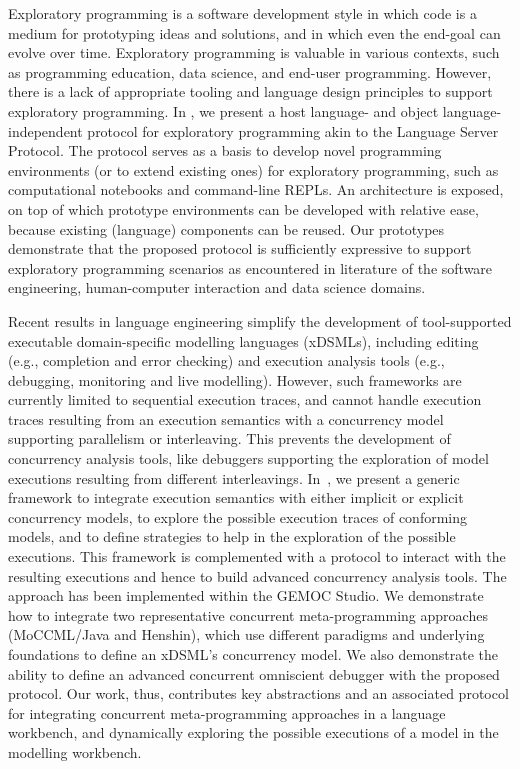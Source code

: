 Exploratory programming is a software development style in which code is a medium for prototyping ideas and solutions, and in which even the end-goal can evolve over time. Exploratory programming is valuable in various contexts, such as programming education, data science, and end-user programming. However, there is a lack of appropriate tooling and language design principles to support exploratory programming. In \cite{vanbinsbergen:hal-03921387}, we present a host language- and object language-independent protocol for exploratory programming akin to the Language Server Protocol. The protocol serves as a basis to develop novel programming environments (or to extend existing ones) for exploratory programming, such as computational notebooks and command-line REPLs. An architecture is exposed, on top of which prototype environments can be developed with relative ease, because existing (language) components can be reused. Our prototypes demonstrate that the proposed protocol is sufficiently expressive to support exploratory programming scenarios as encountered in literature of the software engineering, human-computer interaction and data science domains.

Recent results in language engineering simplify the development of tool-supported executable domain-specific modelling languages (xDSMLs), including editing (e.g., completion and error checking) and execution analysis tools (e.g., debugging, monitoring and live modelling). However, such frameworks are currently limited to sequential execution traces, and cannot handle execution traces resulting from an execution semantics with a concurrency model supporting parallelism or interleaving. This prevents the development of concurrency analysis tools, like debuggers supporting the exploration of model executions resulting from different interleavings. In~\cite{zschaler:hal-03921704}, we present a generic framework to integrate execution semantics with either implicit or explicit concurrency models, to explore the possible execution traces of conforming models, and to define strategies to help in the exploration of the possible executions. This framework is complemented with a protocol to interact with the resulting executions and hence to build advanced concurrency analysis tools. The approach has been implemented within the GEMOC Studio. We demonstrate how to integrate two representative concurrent meta-programming approaches (MoCCML/Java and Henshin), which use different paradigms and underlying foundations to define an xDSML's concurrency model. We also demonstrate the ability to define an advanced concurrent omniscient debugger with the proposed protocol. Our work, thus, contributes key abstractions and an associated protocol for integrating concurrent meta-pro\-gram\-ming approaches in a language workbench, and dynamically exploring the possible executions of a model in the modelling workbench.

